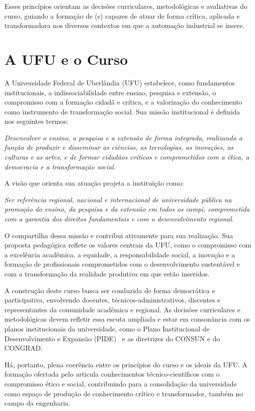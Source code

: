 Esses princípios orientam as decisões curriculares, metodológicas e avaliativas do curso, guiando a formação de \ppctitulacao(s) capazes de atuar de forma crítica, aplicada e transformadora nos diversos contextos em que a automação industrial se insere.

\section{A UFU e o Curso}

A Universidade Federal de Uberlândia (UFU) estabelece, como fundamentos institucionais, a indissociabilidade entre ensino, pesquisa e extensão, o compromisso com a formação cidadã e crítica, e a valorização do conhecimento como instrumento de transformação social. Sua missão institucional é definida nos seguintes termos:

\begin{displayquote}
\textit{Desenvolver o ensino, a pesquisa e a extensão de forma integrada, realizando a função de produzir e disseminar as ciências, as tecnologias, as inovações, as culturas e as artes, e de formar cidadãos críticos e comprometidos com a ética, a democracia e a transformação social.}
\end{displayquote}

A visão que orienta sua atuação projeta a instituição como:

\begin{displayquote}
\textit{Ser referência regional, nacional e internacional de universidade pública na promoção do ensino, da pesquisa e da extensão em todos os campi, comprometida com a garantia dos direitos fundamentais e com o desenvolvimento regional.}
\end{displayquote}

O \ppccurso compartilha dessa missão e contribui ativamente para sua realização. Sua proposta pedagógica reflete os valores centrais da UFU, como o compromisso com a excelência acadêmica, a equidade, a responsabilidade social, a inovação e a formação de profissionais comprometidos com o desenvolvimento sustentável e com a transformação da realidade produtiva em que estão inseridos.

A construção deste curso busca ser conduzida de forma democrática e participativa, envolvendo docentes, técnicos-administrativos, discentes e representantes da comunidade acadêmica e regional. As decisões curriculares e metodológicas devem refletir essa escuta ampliada e estar em consonância com os planos institucionais da universidade, como o Plano Institucional de Desenvolvimento e Expansão (PIDE)~\cite{ufu_consun_31_2022} e as diretrizes do CONSUN e do CONGRAD.

Há, portanto, plena coerência entre os princípios do curso e os ideais da UFU. A formação ofertada pelo \ppccurso articula conhecimentos técnico-científicos com o compromisso ético e social, contribuindo para a consolidação da universidade como espaço de produção de conhecimento crítico e transformador, também no campo da engenharia.
